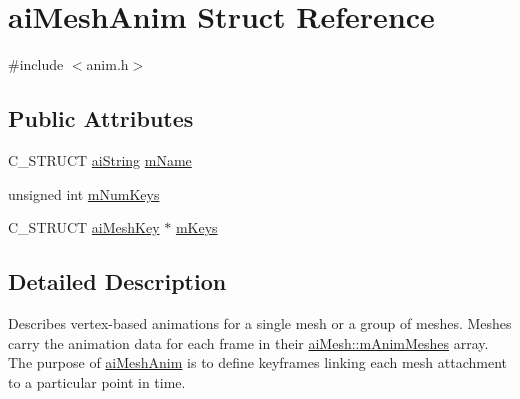 \hypertarget{structaiMeshAnim}{\section{ai\-Mesh\-Anim \-Struct \-Reference}
\label{structaiMeshAnim}
}


{\ttfamily \#include $<$anim.\-h$>$}

\subsection*{\-Public \-Attributes}
\begin{DoxyCompactItemize}
\item 
\-C\-\_\-\-S\-T\-R\-U\-C\-T \hyperlink{structaiString}{ai\-String} \hyperlink{structaiMeshAnim_a20751a739377fdba514c676ef4bda4c7}{m\-Name}
\item 
unsigned int \hyperlink{structaiMeshAnim_aa8702d42bf619ccc8414a556f41634d8}{m\-Num\-Keys}
\item 
\-C\-\_\-\-S\-T\-R\-U\-C\-T \hyperlink{structaiMeshKey}{ai\-Mesh\-Key} $\ast$ \hyperlink{structaiMeshAnim_abc78e9f6d7583c541447e8c389488f1b}{m\-Keys}
\end{DoxyCompactItemize}


\subsection{\-Detailed \-Description}
\-Describes vertex-\/based animations for a single mesh or a group of meshes. \-Meshes carry the animation data for each frame in their \hyperlink{structaiMesh_a5078f7db7e99ed05db89dfa412f0e990}{ai\-Mesh\-::m\-Anim\-Meshes} array. \-The purpose of \hyperlink{structaiMeshAnim}{ai\-Mesh\-Anim} is to define keyframes linking each mesh attachment to a particular point in time. 

